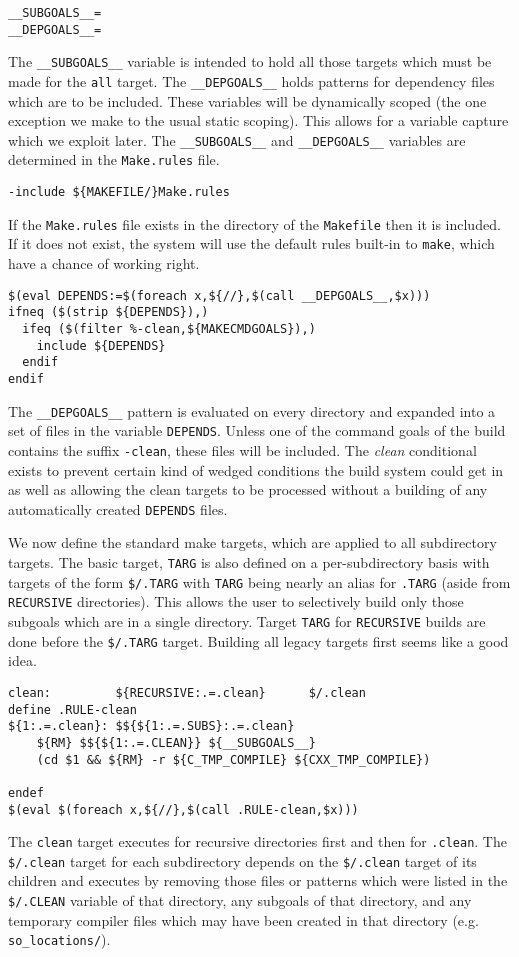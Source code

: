 \documentclass{article}
\begin{document}
\begin{verbatim}
__SUBGOALS__=
__DEPGOALS__=
\end{verbatim}
The \verb+__SUBGOALS__+ variable is intended to hold all those targets
which must be made for the \verb+all+ target.  The \verb+__DEPGOALS__+
holds patterns for dependency files which are to be included.
These variables will be
dynamically scoped (the one exception we make to the usual static scoping).
This allows for a variable capture which we exploit later.  The
\verb+__SUBGOALS__+ and \verb+__DEPGOALS__+ variables are
determined in the \verb+Make.rules+
file.

\begin{verbatim}
-include ${MAKEFILE/}Make.rules
\end{verbatim}
If the \verb+Make.rules+ file exists in the directory of the 
\verb+Makefile+ then it is included.  If it does not exist, the system will
use the default rules built-in to \verb+make+, which have a
chance of working right.

\begin{verbatim}
$(eval DEPENDS:=$(foreach x,${//},$(call __DEPGOALS__,$x)))
ifneq ($(strip ${DEPENDS}),)
  ifeq ($(filter %-clean,${MAKECMDGOALS}),)
    include ${DEPENDS}
  endif
endif
\end{verbatim}
The \verb+__DEPGOALS__+ pattern is evaluated on every directory and
expanded into a set of files in the variable \verb+DEPENDS+.  Unless
one of the command goals of the build contains the suffix \verb+-clean+,
these files will be included.  The {\em clean} conditional exists to
prevent certain kind of wedged conditions the build system could get
in as well as allowing the clean targets to be processed without a
building of any automatically created \verb+DEPENDS+ files.

We now define the standard make targets, which are applied to all
subdirectory targets.  The basic target, \verb+TARG+ is also defined
on a per-subdirectory basis with targets of the form \verb+$/.TARG+
with \verb+TARG+ being nearly an alias for \verb+.TARG+ (aside from
\verb+RECURSIVE+ directories).  This allows
the user to selectively build only those subgoals which are in a
single directory.  Target \verb+TARG+ for \verb+RECURSIVE+ builds are
done before the \verb+$/.TARG+ target.  Building all legacy targets
first seems like a good idea.

\begin{verbatim}
clean:         ${RECURSIVE:.=.clean}      $/.clean
define .RULE-clean
${1:.=.clean}: $${${1:.=.SUBS}:.=.clean}
	${RM} $${${1:.=.CLEAN}} ${__SUBGOALS__}
	(cd $1 && ${RM} -r ${C_TMP_COMPILE} ${CXX_TMP_COMPILE})

endef
$(eval $(foreach x,${//},$(call .RULE-clean,$x)))
\end{verbatim}
The \verb+clean+ target executes for recursive directories first
and then for \verb+.clean+.  The \verb+$/.clean+ target for
each subdirectory depends on the \verb+$/.clean+ target of its
children and executes by removing those files or patterns which were listed
in the \verb+$/.CLEAN+ variable of that directory, any subgoals of
that directory, and any temporary compiler files which may have been
created in that directory (e.g. \verb+so_locations/+).
\end{document}
